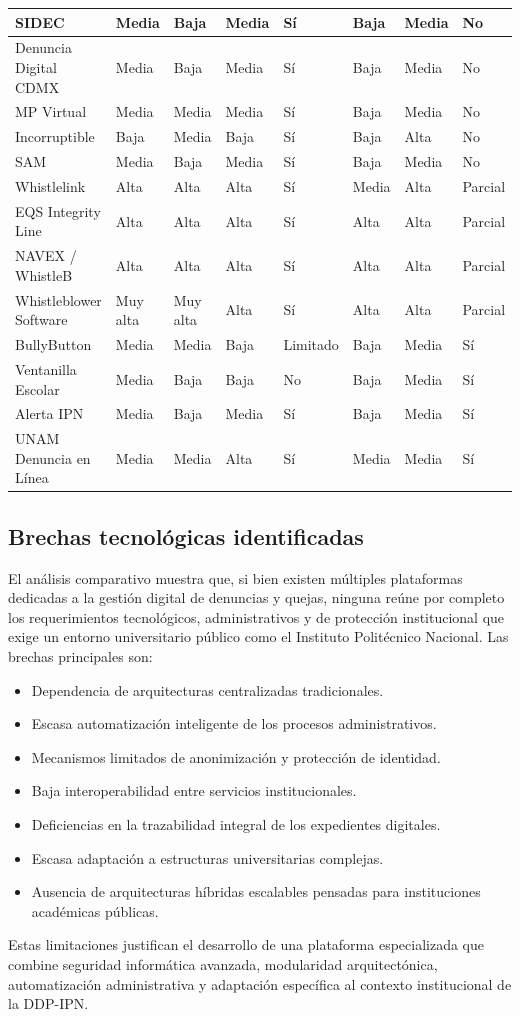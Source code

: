 \begin{longtable}{|p{2.7cm}|p{1.55cm}|p{1.7cm}|p{1.5cm}|p{1.4cm}|p{1.7cm}|p{1.5cm}|p{1.8cm}|}
		SIDEC & Media & Baja & Media & Sí & Baja & Media & No \\ \hline
		Denuncia Digital CDMX & Media & Baja & Media & Sí & Baja & Media & No \\ \hline
		MP Virtual & Media & Media & Media & Sí & Baja & Media & No \\ \hline
		Incorruptible & Baja & Media & Baja & Sí & Baja & Alta & No \\ \hline
		SAM & Media & Baja & Media & Sí & Baja & Media & No \\ \hline
		Whistlelink & Alta & Alta & Alta & Sí & Media & Alta & Parcial \\ \hline
		EQS Integrity Line & Alta & Alta & Alta & Sí & Alta & Alta & Parcial \\ \hline
		NAVEX / WhistleB & Alta & Alta & Alta & Sí & Alta & Alta & Parcial \\ \hline
		Whistleblower Software & Muy alta & Muy alta & Alta & Sí & Alta & Alta & Parcial \\ \hline
		BullyButton & Media & Media & Baja & Limitado & Baja & Media & Sí \\ \hline
		Ventanilla Escolar & Media & Baja & Baja & No & Baja & Media & Sí \\ \hline
		Alerta IPN & Media & Baja & Media & Sí & Baja & Media & Sí \\ \hline
		UNAM Denuncia en Línea & Media & Media & Alta & Sí & Media & Media & Sí \\ \hline
	\end{longtable}
	
	\normalsize
	\setlength{\tabcolsep}{6pt}
	\renewcommand{\arraystretch}{1}
	
	\subsection{Brechas tecnológicas identificadas}
	El análisis comparativo muestra que, si bien existen múltiples plataformas dedicadas a la gestión
	digital de denuncias y quejas, ninguna reúne por completo los requerimientos tecnológicos,
	administrativos y de protección institucional que exige un entorno universitario público como el
	Instituto Politécnico Nacional. Las brechas principales son:
	
	\begin{itemize}
		\item Dependencia de arquitecturas centralizadas tradicionales.
		\item Escasa automatización inteligente de los procesos administrativos.
		\item Mecanismos limitados de anonimización y protección de identidad.
		\item Baja interoperabilidad entre servicios institucionales.
		\item Deficiencias en la trazabilidad integral de los expedientes digitales.
		\item Escasa adaptación a estructuras universitarias complejas.
		\item Ausencia de arquitecturas híbridas escalables pensadas para instituciones académicas
		públicas.
	\end{itemize}
	
	Estas limitaciones justifican el desarrollo de una plataforma especializada que combine seguridad
	informática avanzada, modularidad arquitectónica, automatización administrativa y adaptación
	específica al contexto institucional de la DDP-IPN.
